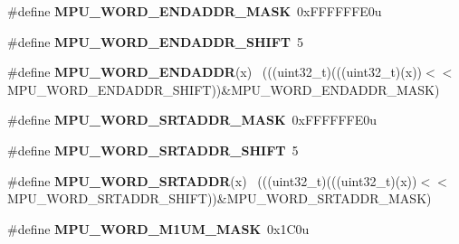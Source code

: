 \begin{DoxyCompactItemize}
\item 
\hypertarget{group___m_p_u___register___masks_gad5d1a04b42678bcb2600ef9ee33a97b2}{}\#define {\bfseries M\+P\+U\+\_\+\+W\+O\+R\+D\+\_\+\+E\+N\+D\+A\+D\+D\+R\+\_\+\+M\+A\+S\+K}~0x\+F\+F\+F\+F\+F\+F\+E0u\label{group___m_p_u___register___masks_gad5d1a04b42678bcb2600ef9ee33a97b2}

\item 
\hypertarget{group___m_p_u___register___masks_ga66676fa259feddcd6fb70b638dd7442e}{}\#define {\bfseries M\+P\+U\+\_\+\+W\+O\+R\+D\+\_\+\+E\+N\+D\+A\+D\+D\+R\+\_\+\+S\+H\+I\+F\+T}~5\label{group___m_p_u___register___masks_ga66676fa259feddcd6fb70b638dd7442e}

\item 
\hypertarget{group___m_p_u___register___masks_ga25bb84bdf148dee22d783795502fb1e6}{}\#define {\bfseries M\+P\+U\+\_\+\+W\+O\+R\+D\+\_\+\+E\+N\+D\+A\+D\+D\+R}(x)                                        ~(((uint32\+\_\+t)(((uint32\+\_\+t)(x))$<$$<$M\+P\+U\+\_\+\+W\+O\+R\+D\+\_\+\+E\+N\+D\+A\+D\+D\+R\+\_\+\+S\+H\+I\+F\+T))\&M\+P\+U\+\_\+\+W\+O\+R\+D\+\_\+\+E\+N\+D\+A\+D\+D\+R\+\_\+\+M\+A\+S\+K)\label{group___m_p_u___register___masks_ga25bb84bdf148dee22d783795502fb1e6}

\item 
\hypertarget{group___m_p_u___register___masks_ga99ac4386c2eefb943305a1faec44419c}{}\#define {\bfseries M\+P\+U\+\_\+\+W\+O\+R\+D\+\_\+\+S\+R\+T\+A\+D\+D\+R\+\_\+\+M\+A\+S\+K}~0x\+F\+F\+F\+F\+F\+F\+E0u\label{group___m_p_u___register___masks_ga99ac4386c2eefb943305a1faec44419c}

\item 
\hypertarget{group___m_p_u___register___masks_ga2a0a92430b9fff9f248ae1ffbe086513}{}\#define {\bfseries M\+P\+U\+\_\+\+W\+O\+R\+D\+\_\+\+S\+R\+T\+A\+D\+D\+R\+\_\+\+S\+H\+I\+F\+T}~5\label{group___m_p_u___register___masks_ga2a0a92430b9fff9f248ae1ffbe086513}

\item 
\hypertarget{group___m_p_u___register___masks_gad6ec8fe07240efe4518dd5ebef31ce9c}{}\#define {\bfseries M\+P\+U\+\_\+\+W\+O\+R\+D\+\_\+\+S\+R\+T\+A\+D\+D\+R}(x)                                        ~(((uint32\+\_\+t)(((uint32\+\_\+t)(x))$<$$<$M\+P\+U\+\_\+\+W\+O\+R\+D\+\_\+\+S\+R\+T\+A\+D\+D\+R\+\_\+\+S\+H\+I\+F\+T))\&M\+P\+U\+\_\+\+W\+O\+R\+D\+\_\+\+S\+R\+T\+A\+D\+D\+R\+\_\+\+M\+A\+S\+K)\label{group___m_p_u___register___masks_gad6ec8fe07240efe4518dd5ebef31ce9c}

\item 
\hypertarget{group___m_p_u___register___masks_gaeac86ca30363b0e3680afeb453979567}{}\#define {\bfseries M\+P\+U\+\_\+\+W\+O\+R\+D\+\_\+\+M1\+U\+M\+\_\+\+M\+A\+S\+K}~0x1\+C0u\label{group___m_p_u___register___masks_gaeac86ca30363b0e3680afeb453979567}


\end{DoxyCompactItemize}
